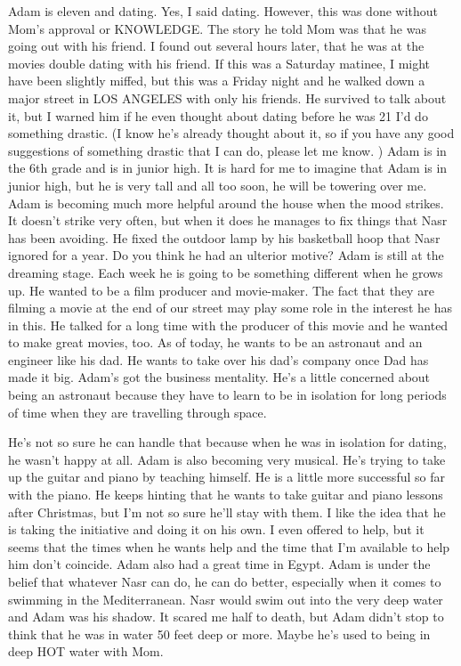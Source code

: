 Adam is eleven and dating. Yes, I said dating. However, this was done without Mom's approval or KNOWLEDGE. The story he told Mom was that he was
going out with his friend. I found out several hours later, that he was at the movies double dating with his friend. If this was a Saturday
matinee, I might have been slightly miffed, but this was a Friday night and he walked down a major street in LOS ANGELES with only his friends.
He survived to talk about it, but I warned him if he even thought about dating before he was 21 I'd do something drastic. (I know he's already
thought about it, so if you have any good suggestions of something drastic that I can do, please let me know. ) Adam is in the 6th grade and is
in junior high. It is hard for me to imagine that Adam is in junior high, but he is very tall and all too soon, he will be towering over me.
Adam is becoming much more helpful around the house when the mood strikes. It doesn't strike very often, but when it does he manages to fix
things that Nasr has been avoiding. He fixed the outdoor lamp by his basketball hoop that Nasr ignored for a year. Do you think he had an
ulterior motive? Adam is still at the dreaming stage. Each week he is going to be something different when he grows up. He wanted to be a film
producer and movie-maker. The fact that they are filming a movie at the end of our street may play some role in the interest he has in this. He
talked for a long time with the producer of this movie and he wanted to make great movies, too. As of today, he wants to be an astronaut and an
engineer like his dad. He wants to take over his dad's company once Dad has made it big. Adam's got the business mentality. He's a little
concerned about being an astronaut because they have to learn to be in isolation for long periods of time when they are travelling through
space.

He's not so sure he can handle that because when he was in isolation for dating, he wasn't happy at all. Adam is also becoming very musical.
He's trying to take up the guitar and piano by teaching himself. He is a little more successful so far with the piano. He keeps hinting that he
wants to take guitar and piano lessons after Christmas, but I'm not so sure he'll stay with them. I like the idea that he is taking the
initiative and doing it on his own. I even offered to help, but it seems that the times when he wants help and the time that I'm available to
help him don't coincide. Adam also had a great time in Egypt. Adam is under the belief that whatever Nasr can do, he can do better, especially
when it comes to swimming in the Mediterranean. Nasr would swim out into the very deep water and Adam was his shadow. It scared me half to
death, but Adam didn't stop to think that he was in water 50 feet deep or more. Maybe he's used to being in deep HOT water with Mom.

